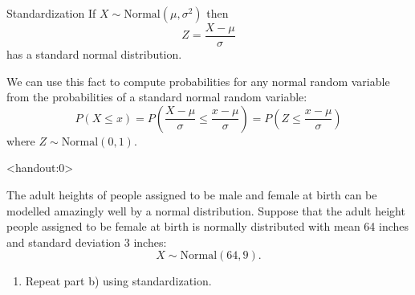 \begin{frame}
  \begin{block}{Standardization}
    If $X \sim \mbox{Normal}(\mu,\sigma^2)$ then
    \[
      Z=\frac{X-\mu}{\sigma}
    \]
    has a standard normal distribution.

    \bigskip

    \pause
    
    We can use this fact to compute probabilities for any normal random variable from the probabilities of a standard normal random variable:
    \[
      P(X \leq x)
      =P\left(\frac{X-\mu}{\sigma} \leq \frac{x-\mu}{\sigma}\right)
      =P\left(Z \leq \frac{x-\mu}{\sigma}\right)
    \]
    where $Z \sim \mbox{Normal}(0,1)$. 
  \end{block}
\end{frame}

\begin{frame}<handout:0>
  \begin{block}{\examplectd}
    The adult heights of people assigned to be male and female at birth can be modelled amazingly well by a normal distribution. Suppose that the adult height people assigned to be female at birth is normally distributed with mean 64 inches and standard deviation 3 inches:
    \[
      X \sim \mbox{Normal}(64,9).
    \]
    
    \begin{enumerate}[label=\alph*),start=4]
    \item Repeat part b) using standardization.
    \end{enumerate}
  \end{block}
\end{frame}

